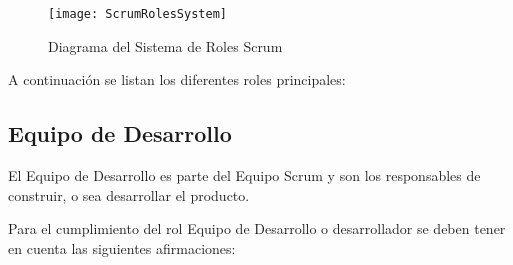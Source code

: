 \begin{figure}[h]
  \centering
  \texttt{[image: ScrumRolesSystem]}
  \caption{Diagrama del Sistema de Roles Scrum}
  \centering
  \label{fig:ScrumRolesSystem} %
\end{figure}
\FloatBarrier

A continuación se listan los diferentes roles principales:

\subsection{Equipo de Desarrollo}

El Equipo de Desarrollo es parte del Equipo Scrum y son los responsables de construir, o sea desarrollar el producto.
 
Para el cumplimiento del rol Equipo de Desarrollo o desarrollador se deben tener en cuenta las siguientes afirmaciones:

